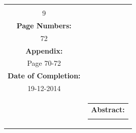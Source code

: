 \begin{titlepage}
\begin{nopagebreak}
{\begin{tabular}{cc}
{\begin{description}
                        \item {\bf Copies:}\\ 9\\
                        \item {\bf Page Numbers:}\\ 72\\
                        \item {\bf Appendix:}\\ Page 70-72\\
                        \item {\bf Date of Completion:}\\ 19-12-2014\\
                    \end{description}
                    \vfill
                } &
                \parbox{7cm}{
                    \vspace{.15cm}
                    \hfill 
                    \begin{tabular}{l}
                        {\bf Abstract:}\bigskip \\
                        \fbox{
                            \parbox{6.5cm}{\smallskip
                                {\vfill{\small 
                                \smallskip}}
                            }
                        }
                    \end{tabular}
                }
            \end{tabular}
        }\\
        \\
    \end{nopagebreak}
\end{titlepage}
